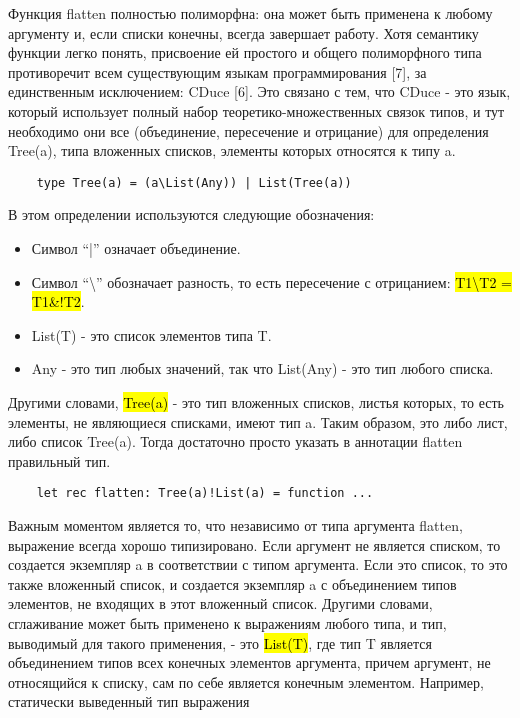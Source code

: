 Функция flatten полностью полиморфна: она может быть применена к любому аргументу и, если списки конечны, всегда
завершает работу.
Хотя семантику функции легко понять, присвоение ей простого и общего полиморфного типа противоречит всем существующим
языкам программирования [7], за единственным исключением: CDuce [6].
Это связано с тем, что CDuce - это язык, который использует полный набор теоретико-множественных связок типов, и
тут необходимо они все (объединение, пересечение и отрицание) для определения Tree(a), типа вложенных списков,
элементы которых относятся к типу a.

\begin{lstlisting}
    type Tree(a) = (a\List(Any)) | List(Tree(a))
\end{lstlisting}

В этом определении используются следующие обозначения:
\begin{itemize}[left=2em]
    \item Символ “|” означает объединение.
    \item Символ “\textbackslash” обозначает разность, то есть пересечение с отрицанием: \hl{T1\textbackslash T2 = T1\&!T2}.
    \item List(T) - это список элементов типа T\@.
    \item Any - это тип любых значений, так что List(Any) - это тип любого списка.
\end{itemize}
Другими словами, \hl{Tree(a)} - это тип вложенных списков, листья которых, то есть элементы, не являющиеся списками, имеют тип a.
Таким образом, это либо лист, либо список Tree(a).
Тогда достаточно просто указать в аннотации flatten правильный тип.

\begin{lstlisting}
    let rec flatten: Tree(a)!List(a) = function ...
\end{lstlisting}

Важным моментом является то, что независимо от типа аргумента flatten, выражение всегда хорошо типизировано.
Если аргумент не является списком, то создается экземпляр a в соответствии с типом аргумента.
Если это список, то это также вложенный список, и создается экземпляр a с объединением типов элементов, не входящих в
этот вложенный список.
Другими словами, сглаживание может быть применено к выражениям любого типа, и тип, выводимый для такого применения, -
это \hl{List(T)}, где тип T является объединением типов всех конечных элементов аргумента, причем аргумент, не относящийся к
списку, сам по себе является конечным элементом.
Например, статически выведенный тип выражения

